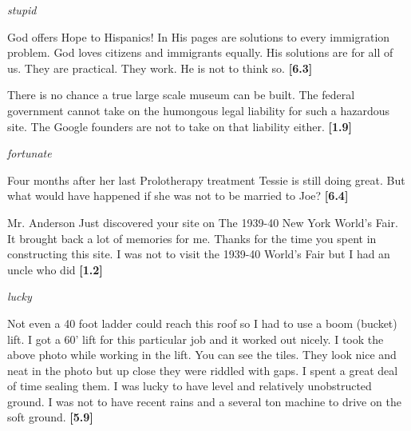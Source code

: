 \documentclass[11pt,fleqn]{article}
\newcommand{\6}{\mbox{$[\hspace*{-.6mm}[$}}
\newcommand{\9}{\mbox{$]\hspace*{-.6mm}]$}}
\begin{document}
\begin{exe}


\ex\label{stupid} {\em stupid}

\begin{xlist}

\ex God offers Hope to Hispanics! In His pages are solutions to every immigration problem. God loves citizens and immigrants equally. His solutions are for all of us. They are practical. They work. He is not  to think so. \hfill {\bf [6.3]}

\ex There is no chance a true large scale museum can be built. The federal government cannot take on the humongous legal liability for such a hazardous site. The Google founders are not  to take on that liability either. \hfill {\bf [1.9]}

\end{xlist}

\ex\label{fort} {\em fortunate}

\begin{xlist}

\ex Four months after her last Prolotherapy treatment  Tessie is still
doing great. But what would have happened if she was not
 to be married to Joe? \hfill {\bf [6.4]}

\ex\label{fair}  Mr. Anderson  Just discovered your site on The 1939-40 New York World's Fair. It brought back a lot of memories for me. Thanks for the time you spent in constructing this site. I was not  to visit the 1939-40 World's Fair but I had an uncle who did \hfill {\bf [1.2]}

\end{xlist}

\ex\label{lucky} {\em lucky}

\begin{xlist}

\ex Not even a 40 foot ladder could reach this roof  so I had to use a boom (bucket) lift. I got a 60' lift for this particular job  and it worked out nicely. I took the above photo while working in the lift. You can see the tiles. They look nice and neat in the photo  but up close  they were riddled with gaps. I spent a great deal of time sealing them. I was lucky to have level and relatively unobstructed ground. I was not  to have recent rains and a several ton machine to drive on the soft ground. \hfill {\bf [5.9]}



\end{xlist}
\end{exe}
\end{document}
